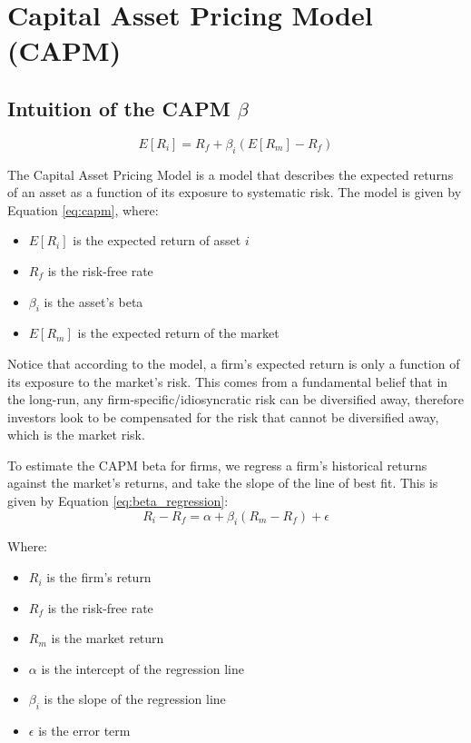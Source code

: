 \section{Capital Asset Pricing Model (CAPM)}
\label{sec:capital_asset_pricing_model}

\subsection{Intuition of the CAPM \texorpdfstring{$\beta$}{beta}}
\begin{equation}
    \label{eq:capm}
    E[R_i] = R_f + \beta_i (E[R_m] - R_f)
\end{equation}

The Capital Asset Pricing Model is a model that describes the expected returns of an asset as a function of its exposure to systematic risk.
The model is given by Equation \ref{eq:capm}, where:
\begin{itemize}
    \item $E[R_i]$ is the expected return of asset $i$
    \item $R_f$ is the risk-free rate
    \item $\beta_i$ is the asset's beta
    \item $E[R_m]$ is the expected return of the market
\end{itemize}

Notice that according to the model, a firm's expected return is only a function of its exposure to the market's risk.
This comes from a fundamental belief that in the long-run, any firm-specific/idiosyncratic risk can be diversified away, therefore
investors look to be compensated for the risk that cannot be diversified away, which is the market risk.

To estimate the CAPM beta for firms, we regress a firm's historical returns against the market's returns, and take the slope of the line of best fit.
This is given by Equation \ref{eq:beta_regression}:
\begin{equation}
    \label{eq:beta_regression}
    R_i - R_f = \alpha + \beta_i (R_m - R_f) + \epsilon
\end{equation}

Where:
\begin{itemize}
    \item $R_i$ is the firm's return
    \item $R_f$ is the risk-free rate
    \item $R_m$ is the market return
    \item $\alpha$ is the intercept of the regression line
    \item $\beta_i$ is the slope of the regression line
    \item $\epsilon$ is the error term
\end{itemize}

